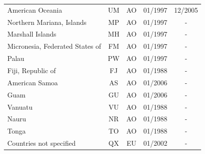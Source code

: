 \begin{small}
\begin{longtable}{p{7.5cm}cccc}
American Oceania	&	UM	&	AO	&	01/1997	&	12/2005	\\
Northern Mariana, Islands	&	MP	&	AO	&	01/1997	&	-	\\
Marshall Islands	&	MH	&	AO	&	01/1997	&	-	\\
Micronesia, Federated States of	&	FM	&	AO	&	01/1997	&	-	\\
Palau	&	PW	&	AO	&	01/1997	&	-	\\
Fiji, Republic of	&	FJ	&	AO	&	01/1988	&	-	\\
American Samoa	&	AS	&	AO	&	01/2006	&	-	\\
Guam	&	GU	&	AO	&	01/2006	&	-	\\
Vanuatu	&	VU	&	AO	&	01/1988	&	-	\\
Nauru	&	NR	&	AO	&	01/1988	&	-	\\
Tonga	&	TO	&	AO	&	01/1988	&	-	\\
Countries not specified	&	QX	&	EU	&	01/2002	&	-	\\
\end{longtable}
\end{small}